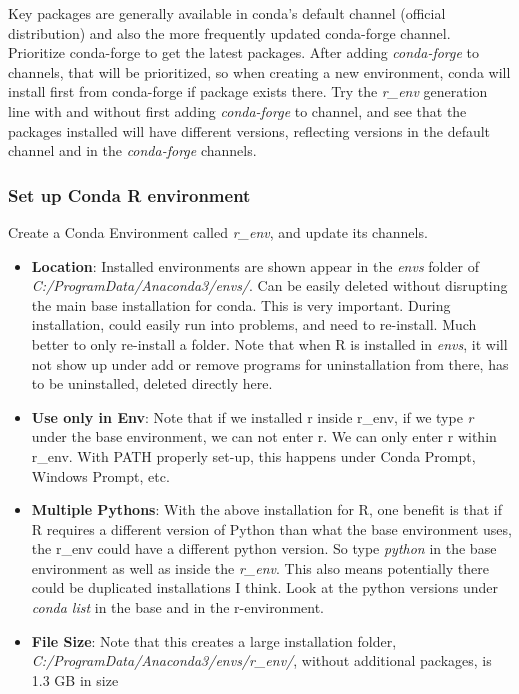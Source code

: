 \documentclass[]{article}
\providecommand{\tightlist}{%
  \setlength{\itemsep}{0pt}\setlength{\parskip}{0pt}}
\begin{document}
Key packages are generally available in conda's default channel
(official distribution) and also the more frequently updated conda-forge
channel. Prioritize conda-forge to get the latest packages. After adding
\emph{conda-forge} to channels, that will be prioritized, so when
creating a new environment, conda will install first from conda-forge if
package exists there. Try the \emph{r\_env} generation line with and
without first adding \emph{conda-forge} to channel, and see that the
packages installed will have different versions, reflecting versions in
the default channel and in the \emph{conda-forge} channels.

\hypertarget{set-up-conda-r-environment}{%
\subsubsection{Set up Conda R
environment}\label{set-up-conda-r-environment}}

Create a Conda Environment called \emph{r\_env}, and update its
channels.

\begin{itemize}
\tightlist
\item
  \textbf{Location}: Installed environments are shown appear in the
  \emph{envs} folder of \emph{C:/ProgramData/Anaconda3/envs/}. Can be
  easily deleted without disrupting the main base installation for
  conda. This is very important. During installation, could easily run
  into problems, and need to re-install. Much better to only re-install
  a folder. Note that when R is installed in \emph{envs}, it will not
  show up under add or remove programs for uninstallation from there,
  has to be uninstalled, deleted directly here.
\item
  \textbf{Use only in Env}: Note that if we installed r inside r\_env,
  if we type \emph{r} under the base environment, we can not enter r. We
  can only enter r within r\_env. With PATH properly set-up, this
  happens under Conda Prompt, Windows Prompt, etc.
\item
  \textbf{Multiple Pythons}: With the above installation for R, one
  benefit is that if R requires a different version of Python than what
  the base environment uses, the r\_env could have a different python
  version. So type \emph{python} in the base environment as well as
  inside the \emph{r\_env}. This also means potentially there could be
  duplicated installations I think. Look at the python versions under
  \emph{conda list} in the base and in the r-environment.
\item
  \textbf{File Size}: Note that this creates a large installation
  folder, \emph{C:/ProgramData/Anaconda3/envs/r\_env/}, without
  additional packages, is 1.3 GB in size
\end{itemize}
\end{document}
